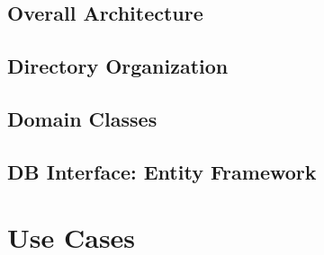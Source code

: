 \documentclass[conference]{IEEEtran}
\begin{document}
        \subsection{Overall Architecture}

        \subsection{Directory Organization}

        \subsection{Domain Classes}
        \subsection{DB Interface: Entity Framework}
            
    \section{Use Cases}
\end{document}
